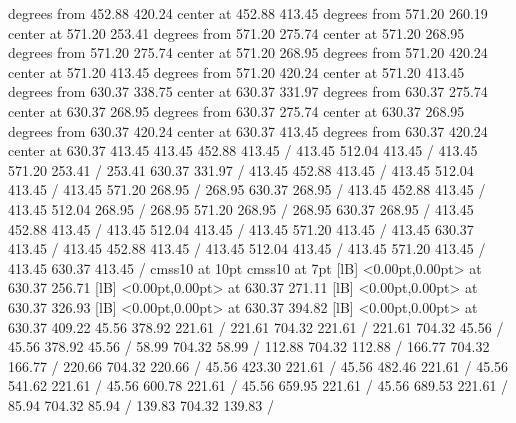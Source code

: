 { degrees from 452.88 420.24 center at 452.88 413.45
 degrees from 571.20 260.19 center at 571.20 253.41
 degrees from 571.20 275.74 center at 571.20 268.95
 degrees from 571.20 275.74 center at 571.20 268.95
 degrees from 571.20 420.24 center at 571.20 413.45
 degrees from 571.20 420.24 center at 571.20 413.45
 degrees from 630.37 338.75 center at 630.37 331.97
 degrees from 630.37 275.74 center at 630.37 268.95
 degrees from 630.37 275.74 center at 630.37 268.95
 degrees from 630.37 420.24 center at 630.37 413.45
 degrees from 630.37 420.24 center at 630.37 413.45
\setdashpattern <4pt, 4pt>
 413.45 452.88 413.45 /
 413.45 512.04 413.45 /
 413.45 571.20 253.41 /
 253.41 630.37 331.97 /
\setdashpattern <4pt, 4pt>
 413.45 452.88 413.45 /
 413.45 512.04 413.45 /
 413.45 571.20 268.95 /
 268.95 630.37 268.95 /
\setdashpattern <4pt, 4pt>
 413.45 452.88 413.45 /
 413.45 512.04 268.95 /
 268.95 571.20 268.95 /
 268.95 630.37 268.95 /
\setdashpattern <4pt, 4pt>
 413.45 452.88 413.45 /
 413.45 512.04 413.45 /
 413.45 571.20 413.45 /
 413.45 630.37 413.45 /
\setdashpattern <4pt, 4pt>
 413.45 452.88 413.45 /
 413.45 512.04 413.45 /
 413.45 571.20 413.45 /
 413.45 630.37 413.45 /
\font\picfont cmss10 at 10pt\picfont
\font\picfont cmss10 at 7pt\picfont
{}  [lB] <0.00pt,0.00pt> at 630.37 256.71
  [lB] <0.00pt,0.00pt> at 630.37 271.11
  [lB] <0.00pt,0.00pt> at 630.37 326.93
  [lB] <0.00pt,0.00pt> at 630.37 394.82
  [lB] <0.00pt,0.00pt> at 630.37 409.22
\setsolid
{} 45.56 378.92 221.61 /
 221.61 704.32 221.61 /
 221.61 704.32 45.56 /
 45.56 378.92 45.56 /
\setsolid
{} 58.99 704.32 58.99 /
\setsolid
{} 112.88 704.32 112.88 /
\setsolid
{} 166.77 704.32 166.77 /
\setsolid
{} 220.66 704.32 220.66 /
\setsolid
{} 45.56 423.30 221.61 /
\setsolid
{} 45.56 482.46 221.61 /
\setsolid
{} 45.56 541.62 221.61 /
\setsolid
{} 45.56 600.78 221.61 /
\setsolid
{} 45.56 659.95 221.61 /
\setsolid
{} 45.56 689.53 221.61 /
\setsolid
{} 85.94 704.32 85.94 /
\setsolid
{} 139.83 704.32 139.83 /
}
